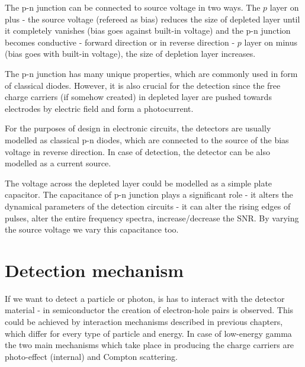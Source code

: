 \par
The p-n junction can be connected to source voltage in two ways. The $p$ layer on plus - the source voltage (refereed as bias) reduces the size of depleted layer until it completely vanishes (bias goes against built-in voltage) and the p-n junction becomes conductive - forward direction or in reverse direction - $p$ layer on minus (bias goes with built-in voltage), the size of depletion layer increases.


\par
The p-n junction has many unique properties, which are commonly used in form of classical diodes. However, it is also crucial for the detection since the free charge carriers (if somehow created) in depleted layer are pushed towards electrodes by electric field and form a photocurrent.

\par
For the purposes of design in electronic circuits, the detectors are usually modelled as classical p-n diodes, which are connected to the source of the bias voltage in reverse direction. In case of detection, the detector can be also modelled as a current source.


\par
The voltage across the depleted layer could be modelled as a simple plate capacitor. The capacitance of p-n junction plays a significant role - it alters the dynamical parameters of the detection circuits - it can alter the rising edges of pulses, alter the entire frequency spectra, increase/decrease the SNR. By varying the source voltage we vary this capacitance too.

\par


\section{Detection mechanism}

\par
If we want to detect a particle or photon, is has to interact with the detector material - in semiconductor the creation of electron-hole pairs is observed. This could be achieved by interaction mechanisms described in previous chapters, which differ for every type of particle and energy. In case of low-energy gamma the two main mechanisms which take place in producing the charge carriers are photo-effect (internal) and Compton scattering.

